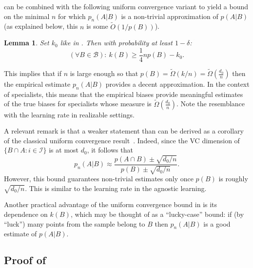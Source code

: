 \documentclass{article}
\def\B{{\mathcal B}}
\newcommand{\I}{\mathcal{I}}
\newtheorem{lemma}[theorem]{Lemma}
\newcommand{\comment}[3]{}  %
\newcommand{\shay}[1]{\comment{purple}{Shay}{#1}}
\begin{document}
 can be combined with the following uniform convergence 
variant to yield a bound on the minimal $n$ for which $p_n(A \vert B)$ 
is a non-trivial approximation of $p(A \vert B)$
(as explained below, this $n$ is some $\tilde O\left(1/p(B)\right)$).
\shay{Is the following lemma is essentially equivalent to \Cref{lemma:points-in-balls}?}
\begin{lemma}\label{lem:uconeside}
Set $k_0$ like in . Then with probability at least $1-\delta$:
\[
(\forall B\in \B):~ k(B) \geq \frac{1}{4}np(B) - {k_0}.
\]
\end{lemma}
This implies that if $n$ is large enough so that $p(B)=\tilde\Omega(k/n)=\tilde\Omega\left(\frac{d_0}{n}\right)$
then the empirical estimate $p_n(A\vert B)$ provides a decent approximation.
In the context of specialists, this means that the empirical
biases provide meaningful estimates of the true biases 
for specialists whose measure is $\tilde\Omega\left(\frac{d_0}{n}\right)$.
Note the resemblance with the learning rate in realizable settings.
%

A relevant remark is that a weaker statement than 
can be derived as a corollary of the classical uniform convergence
result~\citep{V82}. 
Indeed, since the VC dimension of $\{B\cap A : i\in \I\}$ is at most $d_0$, it follows that 
\[p_n(A\vert B)\approx\frac{p(A\cap B) \pm \sqrt{d_0 / n}}{p(B)\pm \sqrt{d_0 / n}}.\]
However, this bound guarantees non-trivial estimates only once $p(B)$ is roughly $\sqrt{d_0  / n}$.
This is similar to the learning rate in the agnostic learning.

Another practical advantage of the uniform convergence bound in  is its dependence on $k(B)$,
which may be thought of as a ``lucky-case'' bound:
if (by ``luck'') many points from the sample belong to $B$ 
then $p_n(A\vert B)$ is a good estimate of $p(A\vert B)$.



\subsection{Proof of }
\end{document}
